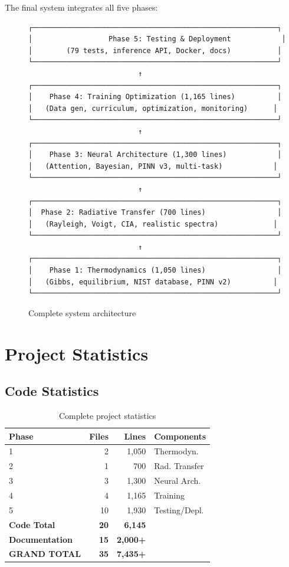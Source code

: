 \documentclass[12pt,a4paper,oneside]{report}
\begin{document}
The final system integrates all five phases:

\begin{figure}[H]
\centering
\begin{verbatim}
┌──────────────────────────────────────────────────────────┐
│                  Phase 5: Testing & Deployment            │
│        (79 tests, inference API, Docker, docs)           │
└──────────────────────────────────────────────────────────┘
                          ↑
┌──────────────────────────────────────────────────────────┐
│    Phase 4: Training Optimization (1,165 lines)          │
│   (Data gen, curriculum, optimization, monitoring)      │
└──────────────────────────────────────────────────────────┘
                          ↑
┌──────────────────────────────────────────────────────────┐
│    Phase 3: Neural Architecture (1,300 lines)            │
│   (Attention, Bayesian, PINN v3, multi-task)            │
└──────────────────────────────────────────────────────────┘
                          ↑
┌──────────────────────────────────────────────────────────┐
│  Phase 2: Radiative Transfer (700 lines)                 │
│   (Rayleigh, Voigt, CIA, realistic spectra)             │
└──────────────────────────────────────────────────────────┘
                          ↑
┌──────────────────────────────────────────────────────────┐
│    Phase 1: Thermodynamics (1,050 lines)                 │
│   (Gibbs, equilibrium, NIST database, PINN v2)          │
└──────────────────────────────────────────────────────────┘
\end{verbatim}
\caption{Complete system architecture}
\end{figure}

\section{Project Statistics}

\subsection{Code Statistics}

\begin{table}[H]
\centering
\begin{tabular}{|l|r|r|l|}
\hline
\textbf{Phase} & \textbf{Files} & \textbf{Lines} & \textbf{Components} \\
\hline
1 & 2 & 1,050 & Thermodyn. \\
2 & 1 & 700 & Rad. Transfer \\
3 & 3 & 1,300 & Neural Arch. \\
4 & 4 & 1,165 & Training \\
5 & 10 & 1,930 & Testing/Depl. \\
\hline
\textbf{Code Total} & \textbf{20} & \textbf{6,145} & \\
\hline
\textbf{Documentation} & \textbf{15} & \textbf{2,000+} & \\
\hline
\textbf{GRAND TOTAL} & \textbf{35} & \textbf{7,435+} & \\
\hline
\end{tabular}
\caption{Complete project statistics}
\end{table}
\end{document}
